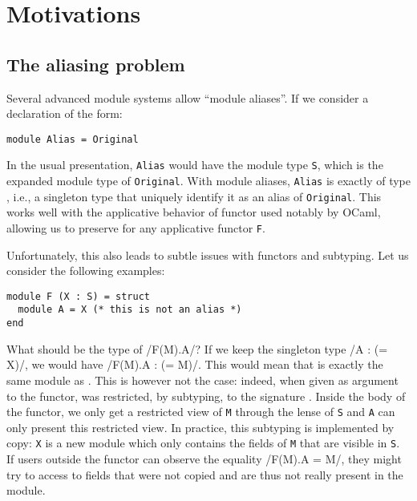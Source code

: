 \section{Motivations}
\label{motivations}

\subsection{The aliasing problem}

Several advanced module systems allow ``module aliases''. If we consider a
declaration of the form:

\begin{verbatim}
module Alias = Original
\end{verbatim}

In the usual presentation, {\tt Alias} would have the module type {\tt S},
which is the expanded module type of {\tt Original}.
With module aliases, {\tt Alias} is exactly of type ,
i.e., a singleton type \cite{XX} that uniquely
identify it as an alias of {\tt Original}. This works well with the applicative
behavior of functor used notably by OCaml,
allowing us to preserve 
for any applicative functor {\tt F}.

Unfortunately, this also leads to subtle issues with functors and subtyping.
Let us consider the following examples:

\begin{verbatim}
module F (X : S) = struct
  module A = X (* this is not an alias *)
end
\end{verbatim}

What should be the type of \ocaml/F(M).A/? If we keep the singleton type
\ocaml/A : (= X)/, we would have \ocaml/F(M).A : (= M)/. This would mean that
 is exactly the same module as . This
is however not the case: indeed, when given as argument to the functor,
 was restricted, by subtyping, to the signature .
Inside the body of the functor, we only get a restricted view of {\tt M} through
the lense of {\tt S} and {\tt A} can only present this restricted view.
In practice, this subtyping is implemented by copy: {\tt X} is a new module
which only contains the fields of {\tt M} that are visible in {\tt S}.
If users outside the functor can observe the equality \ocaml/F(M).A = M/,
they might try to access to fields that were not copied and are thus not
really present in the module.

